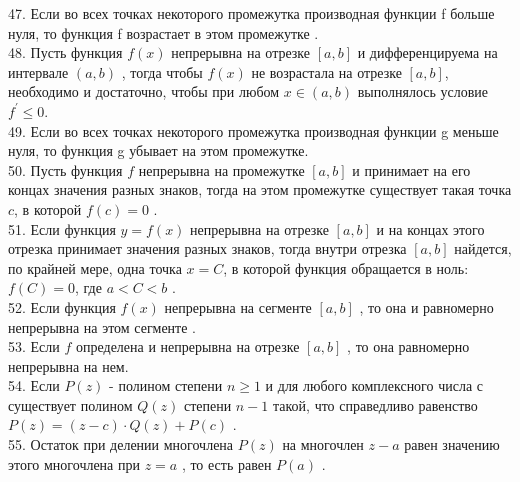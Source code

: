 \documentclass[12pt]{article}
\begin{document}
{{47. Если во всех точках некоторого промежутка производная функции f больше нуля, то функция f возрастает в этом промежутке .\\

48. Пусть функция ${\displaystyle f(x)}$ непрерывна на отрезке  ${\displaystyle [a,b]}$ и дифференцируема на интервале ${\displaystyle (a,b)}$ ,  тогда чтобы ${\displaystyle f(x)}$ не возрастала на отрезке ${\displaystyle [a,b]}$, необходимо и достаточно, чтобы при любом ${\displaystyle x \in (a,b)}$ выполнялось условие ${\displaystyle f^{\prime} \leq 0}$.\\

49. Если во всех точках некоторого промежутка производная функции g меньше нуля, то функция g убывает на этом промежутке.\\

50. Пусть функция ${\displaystyle f}$  непрерывна на промежутке ${\displaystyle [a,b]}$ и принимает на его концах значения разных знаков, тогда на этом промежутке существует такая точка  ${\displaystyle c}$, в которой ${\displaystyle f(c)=0}$ .\\

51. Если функция ${\displaystyle y = f(x)}$ непрерывна на отрезке ${\displaystyle [a, b]}$ и на концах этого отрезка принимает значения разных знаков, тогда внутри отрезка ${\displaystyle [a, b]}$ найдется, по крайней мере, одна точка ${\displaystyle x = C}$, в которой функция обращается в ноль: ${\displaystyle f(C) = 0}$, где ${\displaystyle a < C< b}$ .\\

52. Если функция ${\displaystyle f(x)}$ непрерывна на сегменте ${\displaystyle [a,b]}$ , то она и равномерно непрерывна на этом сегменте .\\

53. Если ${\displaystyle f }$ определена и непрерывна на отрезке ${\displaystyle [a,b]}$ , то она равномерно непрерывна на нем.\\

54. Если ${\displaystyle P(z)}$ - полином степени ${\displaystyle n \geq 1}$ и для любого комплексного числа ${\displaystyle с}$ существует полином ${\displaystyle Q(z)}$ степени ${\displaystyle n-1}$ такой, что справедливо равенство ${\displaystyle P(z)=(z-c)\cdot Q(z)+P(c)}$ .\\

55. Остаток при делении многочлена ${\displaystyle P(z)}$ на многочлен ${\displaystyle z-a}$ равен значению этого многочлена при ${\displaystyle z=a}$ , то есть равен ${\displaystyle P(a)}$ .\\

}}
\end{document}
